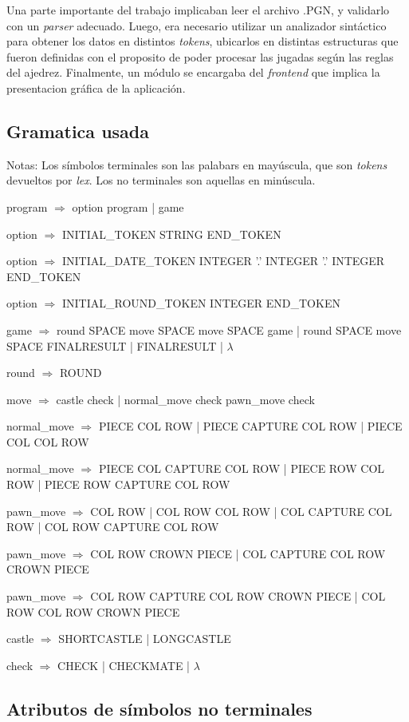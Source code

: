 \documentclass[a4paper,10pt]{article}
\begin{document}
  Una parte importante del trabajo implicaban leer el archivo .PGN, y validarlo con un \textit{parser} adecuado.
Luego, era necesario utilizar un analizador sintáctico para obtener los datos en distintos \textit{tokens}, ubicarlos en distintas
estructuras que fueron definidas con el proposito de poder procesar las jugadas según las reglas del ajedrez.
Finalmente, un módulo se encargaba del \textit{frontend} que implica la presentacion gráfica de la aplicación.

\subsection{Gramatica usada}

Notas: Los símbolos terminales son las palabars en mayúscula, que son \textit{tokens} devueltos por \textit{lex}. Los no terminales 
son aquellas en minúscula.

program $\Rightarrow$  option program | game 

option $\Rightarrow$  INITIAL\_TOKEN STRING END\_TOKEN 

option $\Rightarrow$ INITIAL\_DATE\_TOKEN INTEGER '.' INTEGER '.' INTEGER END\_TOKEN 

option $\Rightarrow$ INITIAL\_ROUND\_TOKEN INTEGER END\_TOKEN 

game $\Rightarrow$ round SPACE move SPACE move SPACE game | round SPACE move SPACE FINALRESULT | FINALRESULT | $\lambda$

round $\Rightarrow$ ROUND               

move $\Rightarrow$  castle check | normal\_move check pawn\_move   check 

normal\_move $\Rightarrow$ PIECE COL ROW | PIECE CAPTURE COL ROW | PIECE COL COL ROW         

normal\_move $\Rightarrow$ PIECE COL CAPTURE COL ROW | PIECE ROW COL ROW | PIECE ROW CAPTURE COL ROW 

pawn\_move $\Rightarrow$ COL ROW | COL ROW COL ROW | COL CAPTURE COL ROW  | COL ROW CAPTURE COL ROW      
       
pawn\_move $\Rightarrow$ COL ROW CROWN PIECE | COL CAPTURE COL ROW CROWN PIECE     

pawn\_move $\Rightarrow$ COL ROW CAPTURE COL ROW CROWN PIECE | COL ROW COL ROW CROWN PIECE         

castle $\Rightarrow$ SHORTCASTLE   | LONGCASTLE   

check $\Rightarrow$ CHECK  | CHECKMATE  | $\lambda$

\subsection{Atributos de símbolos no terminales }
\end{document}

